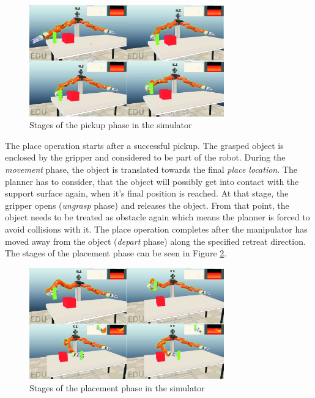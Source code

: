 \begin{figure}[h]
	\centering
  	\includegraphics[width=0.75\textwidth]{images/pickup.jpg}
	\caption{Stages of the pickup phase in the simulator}
	\label{fig:pickup}
\end{figure}

The place operation starts after a successful pickup. The grasped object is enclosed by the gripper and considered to be part of the robot. During the \emph{movement} phase, the object is translated towards the final \emph{place location}. The planner has to consider, that the object will possibly get into contact with the support surface again, when it's final position is reached. At that stage, the gripper opens (\emph{ungrasp} phase) and releases the object. From that point, the object needs to be treated as obstacle again which means the planner is forced to avoid collisions with it. The place operation completes after the manipulator has moved away from the object (\emph{depart} phase) along the specified retreat direction. The stages of the placement phase can be seen in Figure \ref{fig:placement}.

\begin{figure}[h]
	\centering
  	\includegraphics[width=0.75\textwidth]{images/placement.jpg}
	\caption{Stages of the placement phase in the simulator}
	\label{fig:placement}
\end{figure}

